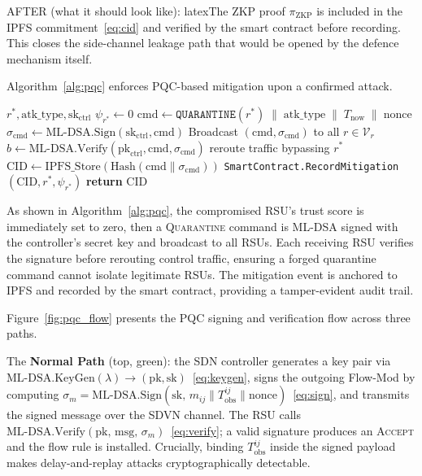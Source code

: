 AFTER (what it should look like):
latexThe ZKP proof $\pi_{\mathrm{ZKP}}$ is included in the IPFS
commitment~\eqref{eq:cid} and verified by the smart contract
before recording. This closes the side-channel leakage path that
would be opened by the defence mechanism itself.

Algorithm~\ref{alg:pqc} enforces PQC-based mitigation
upon a confirmed attack.

\begin{algorithm}[H]
\caption{PQC Mitigation Enforcement (\texttt{PQC-Mitigate})}
\label{alg:pqc}
\begin{algorithmic}[1]
\small
{}
  {$r^*,\mathrm{atk\_type},\mathrm{sk}_{\mathrm{ctrl}}$}
  \State $\psi_{r^*}\gets 0$
  \State $\mathrm{cmd}\gets
    \texttt{QUARANTINE}(r^*)
    \;\|\;\mathrm{atk\_type}
    \;\|\;T_{\mathrm{now}}
    \;\|\;\mathrm{nonce}$
  \State $\sigma_{\mathrm{cmd}}\gets
    \mathrm{ML\text{-}DSA.Sign}
    (\mathrm{sk}_{\mathrm{ctrl}},\mathrm{cmd})$
  \State Broadcast $(\mathrm{cmd},\sigma_{\mathrm{cmd}})$
    to all $r\in\mathcal{V}_r$
    \State $b\gets\mathrm{ML\text{-}DSA.Verify}
      (\mathrm{pk}_{\mathrm{ctrl}},\mathrm{cmd},
      \sigma_{\mathrm{cmd}})$
     reroute traffic bypassing $r^*$
    \EndIf
  \EndFor
  \State $\mathrm{CID}\gets\mathrm{IPFS\_Store}
    (\mathrm{Hash}(\mathrm{cmd}\|\sigma_{\mathrm{cmd}}))$
  \State \texttt{SmartContract.RecordMitigation}
    $(\mathrm{CID},r^*,\psi_{r^*})$
  \State \textbf{return} $\mathrm{CID}$
\EndProcedure
\end{algorithmic}
\end{algorithm}

As shown in Algorithm~\ref{alg:pqc}, the compromised
RSU's trust score is immediately set to zero, then a
\textsc{Quarantine} command is ML-DSA signed with the
controller's secret key and broadcast to all RSUs. Each
receiving RSU verifies the signature before rerouting
control traffic, ensuring a forged quarantine command
cannot isolate legitimate RSUs. The mitigation event is
anchored to IPFS and recorded by the smart contract,
providing a tamper-evident audit trail.

Figure~\ref{fig:pqc_flow} presents the PQC signing and
verification flow across three paths.

The \textbf{Normal Path} (top, green): the SDN controller
generates a key pair via\\
$\mathrm{ML\text{-}DSA\allowbreak.KeyGen}(\lambda) \to
(\mathrm{pk}, \mathrm{sk})$~\eqref{eq:keygen}, signs the
outgoing Flow-Mod by computing
$\sigma_m = \mathrm{ML\text{-}DSA\allowbreak.Sign}(\mathrm{sk},\,
m_{ij} \| T_{\mathrm{obs}}^{ij} \|
\allowbreak\mathrm{nonce})$~\eqref{eq:sign},
and transmits the signed message over the SDVN channel. The RSU
calls $\mathrm{ML\text{-}DSA\allowbreak.Verify}(\mathrm{pk},\,
\mathrm{msg},\, \sigma_m)$~\eqref{eq:verify}; a valid signature
produces an \textsc{Accept} and the flow rule is installed.
Crucially, binding $T_{\mathrm{obs}}^{ij}$ inside the signed
payload makes delay-and-replay attacks cryptographically
detectable.

